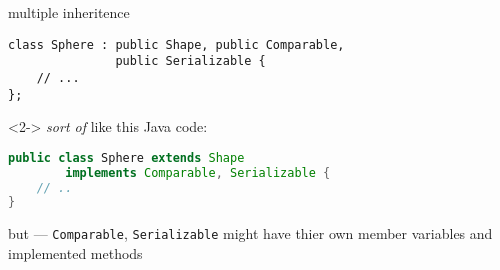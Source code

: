 \begin{frame}[fragile,label=MIBasic]{multiple inheritence}
\lstset{
    language=C++,style=small
}
\begin{lstlisting}
class Sphere : public Shape, public Comparable, 
               public Serializable {
    // ...
};
\end{lstlisting}
\begin{visibleenv}<2->
\textit{sort of} like this Java code:
\begin{lstlisting}[language=Java,style=small]
public class Sphere extends Shape
        implements Comparable, Serializable {
    // ..
}
\end{lstlisting}
but --- \texttt{Comparable}, \texttt{Serializable} might have thier own member variables and implemented methods
\end{visibleenv}
\end{frame}
